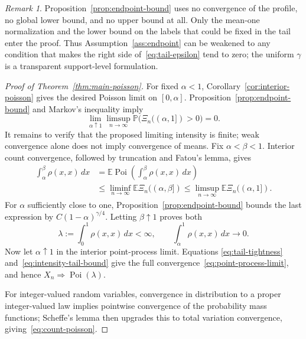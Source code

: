 \documentclass[11pt]{article}
\theoremstyle{remark}
\newtheorem{remark}[theorem]{Remark}
\theoremstyle{plain}
\newcommand{\E}{\mathbb E}
\newcommand{\Pp}{\mathbb P}
\newcommand{\Poi}{\operatorname{Poi}}
\begin{document}
\begin{remark}\label{rmk:minimal-tail}
Proposition~\ref{prop:endpoint-bound} uses no convergence of the profile, no
global lower bound, and no upper bound at all.  Only the mean-one normalization
and the lower bound on the labels that could be fixed in the tail enter the
proof.  Thus Assumption~\ref{ass:endpoint} can be weakened to any condition
that makes the right side of~\eqref{eq:tail-epsilon} tend to zero; the uniform
$\gamma$ is a transparent support-level formulation.
\end{remark}

\begin{proof}[Proof of Theorem~\ref{thm:main-poisson}]
For fixed $\alpha<1$, Corollary~\ref{cor:interior-poisson} gives the desired
Poisson limit on $[0,\alpha]$.  Proposition~\ref{prop:endpoint-bound} and
Markov's inequality imply
\begin{equation}\label{eq:tail-tightness}
 \lim_{\alpha\uparrow1}\limsup_{n\to\infty}
 \Pp\bigl(\Xi_n((\alpha,1])>0\bigr)=0.
\end{equation}
It remains to verify that the proposed limiting intensity is finite; weak
convergence alone does not imply convergence of means.  Fix
$\alpha<\beta<1$.  Interior count convergence, followed by truncation and
Fatou's lemma, gives
\begin{align*}
 \int_\alpha^\beta\rho(x,x)\,dx
 &=\E\Poi\left(\int_\alpha^\beta\rho(x,x)\,dx\right)\\
 &\le\liminf_{n\to\infty}\E\Xi_n((\alpha,\beta])
 \le\limsup_{n\to\infty}\E\Xi_n((\alpha,1]).
\end{align*}
For $\alpha$ sufficiently close to one,
Proposition~\ref{prop:endpoint-bound} bounds the last expression by
$C(1-\alpha)^{\gamma/4}$.  Letting $\beta\uparrow1$ proves both
\begin{equation}\label{eq:intensity-tail-bound}
 \lambda:=\int_0^1\rho(x,x)\,dx<\infty,
 \qquad
 \int_\alpha^1\rho(x,x)\,dx\longrightarrow0.
\end{equation}
Now let $\alpha\uparrow1$ in the interior point-process limit.  Equations
\eqref{eq:tail-tightness} and~\eqref{eq:intensity-tail-bound} give the full
convergence~\eqref{eq:point-process-limit}, and hence
$X_n\Rightarrow\Poi(\lambda)$.

For integer-valued random variables, convergence in distribution to a proper
integer-valued law implies pointwise convergence of the probability mass
functions; Scheffe's lemma then upgrades this to total variation convergence,
giving~\eqref{eq:count-poisson}.
\end{proof}
\end{document}
